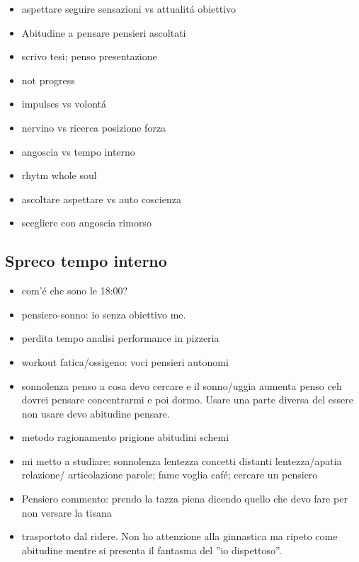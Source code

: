 \begin{itemize}

\item aspettare seguire sensazioni vs attualit\'a obiettivo

\item Abitudine a pensare pensieri ascoltati

\item scrivo tesi; penso presentazione

\item not progress

\item impulses vs volont\'a

\item nervino vs ricerca posizione forza

\item angoscia vs tempo interno

\item rhytm whole soul

\item ascoltare aspettare vs auto coscienza

\item scegliere con angoscia rimorso

\end{itemize}

\subsection{Spreco tempo interno}

\begin{itemize}

\item com'\'e che sono le 18:00?

\item pensiero-sonno: io senza obiettivo me.

\item perdita tempo analisi performance in pizzeria

\item workout fatica/ossigeno: voci pensieri autonomi

\item sonnolenza penso a cosa devo cercare e il sonno/uggia aumenta penso ceh dovrei pensare concentrarmi e poi dormo. Usare una parte diversa del essere non usare devo abitudine pensare.

\item metodo ragionamento prigione abitudini schemi

\item mi metto a studiare: sonnolenza lentezza concetti distanti lentezza/apatia relazione/ articolazione parole; fame voglia caf\'e; cercare un pensiero

\item Pensiero commento: prendo la tazza piena dicendo quello che devo fare per non versare la tisana

\item trasportoto dal ridere. Non ho attenzione alla ginnastica ma ripeto come abitudine mentre si presenta il fantasma del ''io dispettoso''.

\end{itemize}

